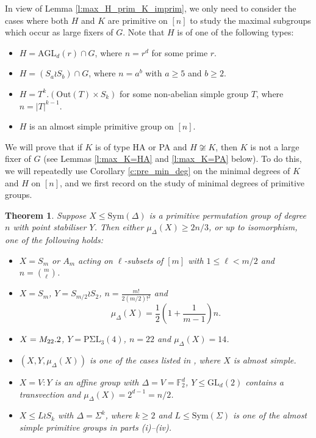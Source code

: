 \documentclass[twoside,a4paper,reqno,11pt]{amsart}
\newcommand{\<}{\langle}
\renewcommand{\>}{\rangle}
\newcommand{\leqs}{\leqslant}
\newcommand{\geqs}{\geqslant}
\newcommand{\Out}{\mathrm{Out}}
\newcommand{\GL}{\mathrm{GL}}
\newcommand{\PSigmaL}{\mathrm{P\Sigma L}}
\def\Ma{{\rm M}}
\newtheorem{thm}{Theorem}[section]
\theoremstyle{definition}
\begin{document}
	In view of Lemma \ref{l:max_H_prim_K_imprim}, we only need to consider the cases where both $H$ and $K$ are primitive on $[n]$ to study the maximal subgroups which occur as large fixers of $G$. Note that $H$ is of one of the following types:
	\begin{itemize}\addtolength{\itemsep}{0.2\baselineskip}
		\item[{\rm HA:}] $H = \mathrm{AGL}_d(r)\cap G$, where $n = r^d$ for some prime $r$.
		\item[{\rm PA:}] $H = (S_a\wr S_b)\cap G$, where $n = a^b$ with $a\geqs 5$ and $b\geqs 2$.
		\item[{\rm SD:}] $H = T^k.(\Out(T)\times S_k)$ for some non-abelian simple group $T$, where $n = |T|^{k-1}$.
		\item[{\rm AS:}] $H$ is an almost simple primitive group on $[n]$.
	\end{itemize}
	
	We will prove that if $K$ is of type HA or PA and $H\not\cong K$, then $K$ is not a large fixer of $G$ (see Lemmas \ref{l:max_K=HA} and \ref{l:max_K=PA} below). To do this, we will repeatedly use Corollary \ref{c:pre_min_deg} on the minimal degrees of $K$ and $H$ on $[n]$, and we first record \cite[Theorem 4]{BG_min_deg} on the study of minimal degrees of primitive groups.
	
	\begin{thm}
		\label{t:BG_min_deg}
		Suppose $X\leqs \mathrm{Sym}(\Delta)$ is a primitive permutation group of degree $n$ with point stabiliser $Y$. Then either $\mu_\Delta(X)\geqs 2n/3$, or up to isomorphism, one of the following holds:
		\begin{itemize}\addtolength{\itemsep}{0.2\baselineskip}
			\item[{\rm (i)}] $X = S_m$ or $A_m$ acting on $\ell$-subsets of $[m]$ with $1\leqs \ell < m/2$ and $n = {m\choose \ell}$.
			\item[{\rm (ii)}] $X = S_m$, $Y = S_{m/2}\wr S_2$, $n = \frac{m!}{2(m/2)!^2}$ and
			\begin{equation*}
			\mu_\Delta(X) = \frac{1}{2}\left(1+\frac{1}{m-1}\right)n.
			\end{equation*}
			\item[{\rm (iii)}] $X = \Ma_{22}.2$, $Y = \PSigmaL_3(4)$, $n = 22$ and $\mu_\Delta(X) = 14$.
			\item[{\rm (iv)}] $(X,Y,\mu_\Delta(X))$ is one of the cases listed in \cite[Table 2]{BG_min_deg}, where $X$ is almost simple.
			\item[{\rm (v)}] $X = V{:}Y$ is an affine group with $\Delta = V = \mathbb{F}_2^d$, $Y\leqs \GL_d(2)$ contains a transvection and $\mu_\Delta(X) = 2^{d-1} = n/2$.
			\item[{\rm (vi)}] $X \leqs L\wr S_k$ with $\Delta = \Sigma^k$, where $k\geqs 2$ and $L\leqs\mathrm{Sym}(\Sigma)$ is one of the almost simple primitive groups in parts (i)--(iv).
		\end{itemize}
	\end{thm}
	
\end{document}
